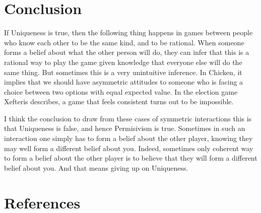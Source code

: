 \documentclass[
  11pt,
]{article}
\begin{document}
\hypertarget{conclusion}{%
\section{Conclusion}\label{conclusion}}

If Uniqueness is true, then the following thing happens in games between people who know each other to be the same kind, and to be rational. When someone forms a belief about what the other person will do, they can infer that this is a rational way to play the game given knowledge that everyone else will do the same thing. But sometimes this is a very unintuitive inference. In Chicken, it implies that we should have asymmetric attitudes to someone who is facing a choice between two options with equal expected value. In the election game Xefteris describes, a game that feels consistent turns out to be impossible.

I think the conclusion to draw from these cases of symmetric interactions this is that Uniqueness is false, and hence Permisivism is true. Sometimes in such an interaction one simply has to form a belief about the other player, knowing they may well form a different belief about you. Indeed, sometimes only coherent way to form a belief about the other player is to believe that they will form a different belief about you. And that means giving up on Uniqueness.

\hypertarget{references}{%
\section*{References}\label{references}}
\end{document}
